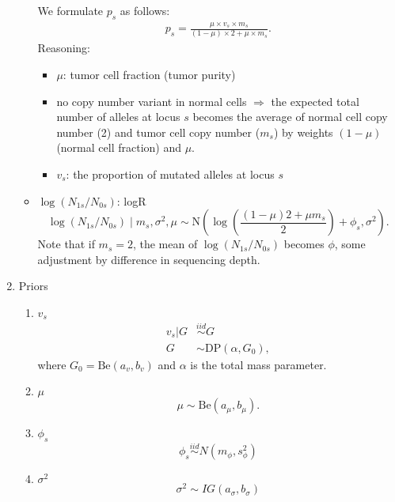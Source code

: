 \documentclass[12pt]{article}
\newcommand{\bc}{\mbox{\boldmath $c$}}
\newcommand{\Be}{\mbox{Be}}
\newcommand{\Nor}{\mbox{N}}
\newcommand{\iid}{\stackrel{iid}{\sim}}
\begin{document}
\begin{enumerate}
\begin{itemize}
We formulate $p_s$ as follows:
\begin{eqnarray*}
p_s =\frac{\mu \times v_s  \times m_s}{(1-\mu)\times 2 + \mu \times m_s}.
\end{eqnarray*}
Reasoning:  
\begin{itemize}
\item $\mu$: tumor cell fraction (tumor purity)
\item no copy number variant in normal cells  $\Rightarrow$ the expected total number of alleles at locus $s$ becomes the average of normal cell copy number (2) and  tumor cell copy number ($m_s$) by weights $(1-\mu)$ (normal cell fraction) and $\mu$.
\item $v_s$: the proportion of mutated alleles at locus $s$
\end{itemize}

\item $\log(N_{1s}/N_{0s})$: logR
$$
\log(N_{1s}/N_{0s}) \mid m_s, \sigma^2, \mu \sim \Nor\left(\log\left(\frac{(1-\mu)2 + \mu m_s}{2}\right) + \phi_s, \sigma^2\right).
$$
Note that if $m_s=2$, the mean of $\log(N_{1s}/N_{0s})$ becomes $\phi$, some adjustment by difference in sequencing depth. 
\end{itemize}





\item Priors
\begin{enumerate}
\item $v_s$
\begin{align*}
  v_s | G &\iid G \\
  G &\sim \text{DP}(\alpha,G_0),
\end{align*}
where $G_0 = \Be(a_v, b_v)$ and $\alpha$ is the total mass parameter.

\item $\mu$
$$
\mu \sim \Be(a_\mu, b_\mu).
$$

\item $\phi_s$
  $$
  \phi_s \iid N(m_\phi, s^2_\phi)
  $$

\item $\sigma^2$
  $$
  \sigma^2 \sim IG(a_\sigma,b_\sigma)
  $$

\end{enumerate}
\end{enumerate}

\newpage
\newcommand{\ind}{\overset{ind}{\sim}}
\newcommand{\p}[1]{\left(#1\right)}
\newcommand{\bk}[1]{\left[#1\right]}
\renewcommand{\bc}[1]{ \left\{#1\right\} }
\newcommand{\abs}[1]{ \left|#1\right| }
\newcommand{\norm}[1]{ \left|\left|#1\right|\right| }
\newcommand{\N}{ \mathcal N }
\renewcommand{\L}{ \mathcal L }
\newcommand{\ds}{ \displaystyle }
\newcommand{\sums}{\sum_{s=1}^S}
\newcommand{\prods}{\prod_{s=1}^S}
\allowdisplaybreaks
\end{document}
